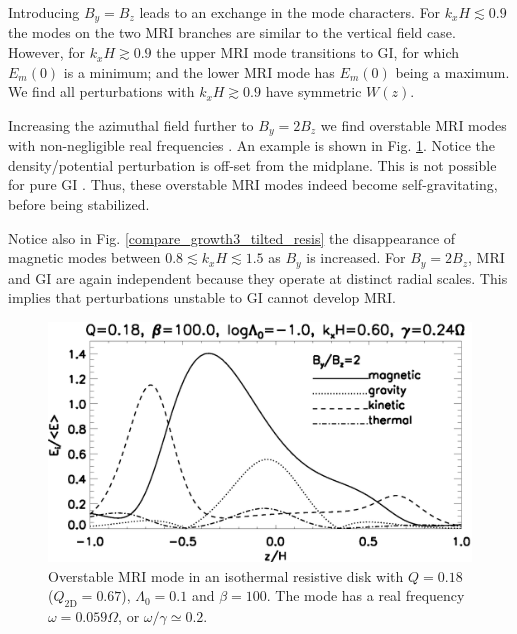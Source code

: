 Introducing $B_y = B_z$ leads to an exchange in the mode
characters. For $k_xH\lesssim 0.9$ the modes on the two MRI branches
are similar to the vertical field case. However, for $k_xH\gtrsim0.9$ 
the upper MRI mode transitions to GI, for which $E_m(0)$ is a
minimum; and the lower MRI mode has $E_m(0)$ being a maximum. We find
all perturbations with  $k_xH\gtrsim0.9$ have symmetric $W(z)$. 


Increasing the azimuthal field further to $B_y=2B_z$ we find
overstable MRI modes  with non-negligible real
frequencies \citep{gammie96}. An example is shown in
Fig. \ref{result_tilted_overstable}. Notice the density/potential
perturbation is off-set from the midplane. This is not possible for
pure GI \citep{goldreich65a}. Thus, these overstable MRI modes indeed
become self-gravitating, before being stabilized. 

Notice also in Fig. \ref{compare_growth3_tilted_resis} the disappearance of
magnetic modes between $0.8\lesssim k_xH\lesssim 1.5$ as $B_y$ is
increased. For $B_y=2B_z$, MRI and GI are again independent 
because they operate at distinct radial scales. This implies that
perturbations unstable to GI cannot develop MRI.       


\begin{figure}
  \includegraphics[width=\linewidth,clip=true,trim=0cm 0cm 0cm
    0cm]{figures/result_tilted_resis.ps}
  \caption{Overstable MRI mode in an isothermal resistive disk with
    $Q=0.18$ ($Q_\mathrm{2D} = 0.67$), $\Lambda_0=0.1$ and $\beta=100$. 
    The mode has a real frequency $\omega = 0.059\Omega$, or
    $\omega/\gamma \simeq 0.2 $.   
    \label{result_tilted_overstable}}
\end{figure}
